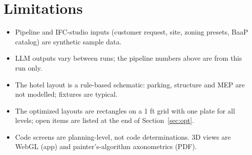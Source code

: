 \documentclass[10pt]{article}
\begin{document}
\section{Limitations}
\begin{itemize}
\item Pipeline and IFC-studio inputs (customer request, site, zoning presets, BaaP catalog) are synthetic sample data.
\item LLM outputs vary between runs; the pipeline numbers above are from this run only.
\item The hotel layout is a rule-based schematic: parking, structure and MEP are not modelled; fixtures are typical.
\item The optimized layouts are rectangles on a 1 ft grid with one plate for all levels; open items are listed at the end of Section~\ref{sec:opt}.
\item Code screens are planning-level, not code determinations. 3D views are WebGL (app) and painter's-algorithm axonometrics (PDF).
\end{itemize}

\appendix
\end{document}
